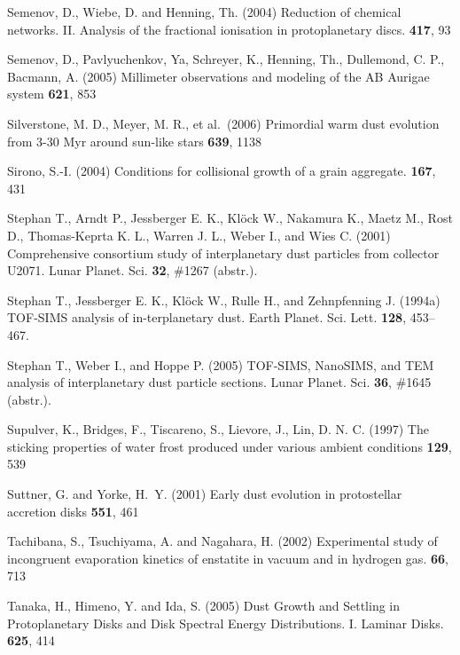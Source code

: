 \begin{literature}
\item
Semenov, D., Wiebe, D. and Henning, Th. (2004) Reduction of chemical
networks.  II. Analysis of the fractional ionisation in protoplanetary
discs. \aap \textbf{417}, 93

\item
Semenov, D., Pavlyuchenkov, Ya, Schreyer, K., Henning, Th., Dullemond,
C. P., Bacmann, A. (2005) Millimeter observations and modeling of the AB
Aurigae system \apj \textbf{621}, 853

\item
Silverstone, M. D., Meyer, M. R., et al.~(2006) Primordial warm dust
evolution from 3-30 Myr around sun-like stars \apj \textbf{639}, 1138

\item
Sirono, S.-I. (2004) Conditions for collisional growth of a grain aggregate.
\ica \textbf{167}, 431

\item
Stephan T., Arndt P., Jessberger E. K., Kl\"ock W., Nakamura K., Maetz M.,
Rost D., Thomas-Keprta K. L., Warren J. L., Weber I., and Wies C. (2001)
Comprehensive consortium study of interplanetary dust particles from
collector U2071. Lunar Planet. Sci. \textbf{32}, \#1267 (abstr.).

\item 
Stephan T., Jessberger E. K., Kl\"ock W., Rulle H., and Zehnpfenning
J. (1994a) TOF-SIMS analysis of in-terplanetary dust. Earth
Planet. Sci. Lett. \textbf{128}, 453--467.

\item 
Stephan T., Weber I., and Hoppe P. (2005) TOF-SIMS, NanoSIMS, and TEM
analysis of interplanetary dust particle sections. Lunar
Planet. Sci. \textbf{36}, \#1645 (abstr.).

\item
Supulver, K., Bridges, F., Tiscareno, S., Lievore, J., 
Lin, D. N. C. (1997) The sticking properties of water frost produced under
various ambient conditions \ica \textbf{129}, 539

\item
Suttner, G. and Yorke, H.~Y. (2001) Early dust evolution in protostellar
accretion disks \apj \textbf{551}, 461

\item
Tachibana, S., Tsuchiyama, A. and Nagahara, H. (2002) Experimental study of
incongruent evaporation kinetics of enstatite in vacuum and in hydrogen gas. 
\gca \textbf{66}, 713

\item
Tanaka, H., Himeno, Y. and Ida, S. (2005) Dust Growth and Settling in
Protoplanetary Disks and Disk Spectral Energy Distributions. I. Laminar Disks.
\apj \textbf{625}, 414


\end{literature}

